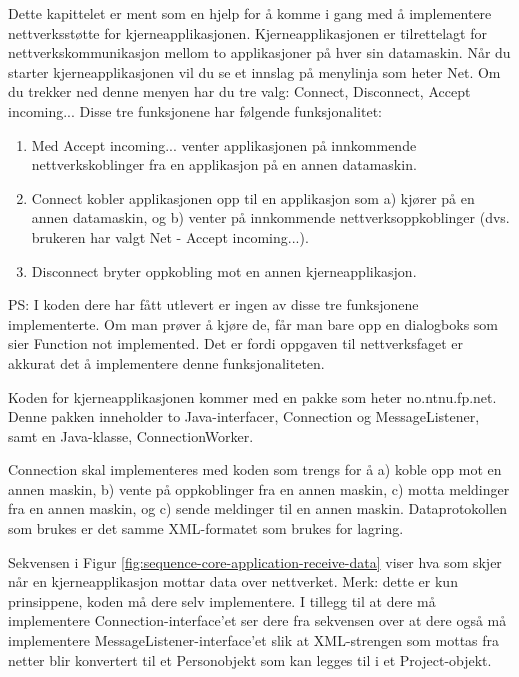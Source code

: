 Dette kapittelet er ment som en hjelp for å komme i gang med å implementere nettverksstøtte for kjerneapplikasjonen. Kjerneapplikasjonen er tilrettelagt for nettverkskommunikasjon mellom to applikasjoner på hver sin datamaskin. Når du starter kjerneapplikasjonen vil du se et innslag på menylinja som heter Net. Om du trekker ned denne menyen har du tre valg: Connect, Disconnect, Accept incoming... Disse tre funksjonene har følgende funksjonalitet:

\begin{enumerate}

\item
Med Accept incoming... venter applikasjonen på innkommende nettverkskoblinger fra en applikasjon på en annen datamaskin.

\item
Connect kobler applikasjonen opp til en applikasjon som a) kjører på en annen datamaskin, og b) venter på innkommende nettverksoppkoblinger (dvs. brukeren har valgt Net - Accept incoming...). 

\item
Disconnect bryter oppkobling mot en annen kjerneapplikasjon.

\end{enumerate}

PS: I koden dere har fått utlevert er ingen av disse tre funksjonene implementerte. Om man prøver å kjøre de, får man bare opp en dialogboks som sier Function not implemented. Det er fordi oppgaven til nettverksfaget er akkurat det å implementere denne funksjonaliteten.

Koden for kjerneapplikasjonen kommer med en pakke som heter no.ntnu.fp.net. Denne pakken inneholder to Java-interfacer, Connection og MessageListener, samt en Java-klasse, ConnectionWorker.

Connection skal implementeres med koden som trengs for å a) koble opp mot en annen maskin, b) vente på oppkoblinger fra en annen maskin, c) motta meldinger fra en annen maskin, og c) sende meldinger til en annen maskin. Dataprotokollen som brukes er det samme XML-formatet som brukes for lagring.  

Sekvensen i Figur \ref{fig:sequence-core-application-receive-data} viser hva som skjer når en kjerneapplikasjon mottar data over nettverket. Merk: dette er kun prinsippene, koden må dere selv implementere. I tillegg til at dere må implementere Connection-interface'et ser dere fra sekvensen over at dere også må implementere MessageListener-interface'et slik at XML-strengen som mottas fra netter blir konvertert til et Personobjekt som kan legges til i et Project-objekt.


